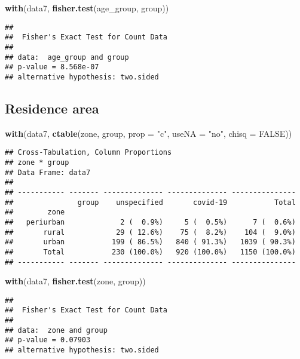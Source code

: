 \documentclass[
]{article}
\newenvironment{Shaded}{\begin{snugshade}}{\end{snugshade}}
\newcommand{\DataTypeTok}[1]{\textcolor[rgb]{0.13,0.29,0.53}{#1}}
\newcommand{\KeywordTok}[1]{\textcolor[rgb]{0.13,0.29,0.53}{\textbf{#1}}}
\newcommand{\NormalTok}[1]{#1}
\newcommand{\OtherTok}[1]{\textcolor[rgb]{0.56,0.35,0.01}{#1}}
\newcommand{\StringTok}[1]{\textcolor[rgb]{0.31,0.60,0.02}{#1}}
\begin{document}
\begin{Shaded}
\begin{Highlighting}[]
\KeywordTok{with}\NormalTok{(data7, }\KeywordTok{fisher.test}\NormalTok{(age_group, group))}
\end{Highlighting}
\end{Shaded}

\begin{verbatim}
## 
##  Fisher's Exact Test for Count Data
## 
## data:  age_group and group
## p-value = 8.568e-07
## alternative hypothesis: two.sided
\end{verbatim}

\hypertarget{residence-area}{%
\subsection{Residence area}\label{residence-area}}

\begin{Shaded}
\begin{Highlighting}[]
\KeywordTok{with}\NormalTok{(data7, }\KeywordTok{ctable}\NormalTok{(zone, group, }\DataTypeTok{prop =} \StringTok{"c"}\NormalTok{, }\DataTypeTok{useNA =} \StringTok{"no"}\NormalTok{, }\DataTypeTok{chisq =} \OtherTok{FALSE}\NormalTok{))}
\end{Highlighting}
\end{Shaded}

\begin{verbatim}
## Cross-Tabulation, Column Proportions  
## zone * group  
## Data Frame: data7  
## 
## ----------- ------- -------------- -------------- ---------------
##               group    unspecified       covid-19           Total
##        zone                                                      
##   periurban             2 (  0.9%)     5 (  0.5%)      7 (  0.6%)
##       rural            29 ( 12.6%)    75 (  8.2%)    104 (  9.0%)
##       urban           199 ( 86.5%)   840 ( 91.3%)   1039 ( 90.3%)
##       Total           230 (100.0%)   920 (100.0%)   1150 (100.0%)
## ----------- ------- -------------- -------------- ---------------
\end{verbatim}

\begin{Shaded}
\begin{Highlighting}[]
\KeywordTok{with}\NormalTok{(data7, }\KeywordTok{fisher.test}\NormalTok{(zone, group))}
\end{Highlighting}
\end{Shaded}

\begin{verbatim}
## 
##  Fisher's Exact Test for Count Data
## 
## data:  zone and group
## p-value = 0.07903
## alternative hypothesis: two.sided
\end{verbatim}
\end{document}
